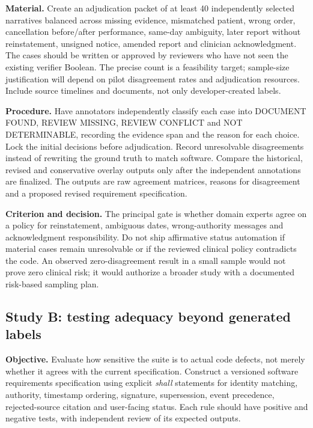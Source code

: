 \documentclass[11pt,twocolumn]{article}
\newcommand{\stage}[1]{\textsf{#1}}
\begin{document}
\textbf{Material.} Create an adjudication packet of at least 40 independently selected narratives balanced across missing evidence, mismatched patient, wrong order, cancellation before/after performance, same-day ambiguity, later report without reinstatement, unsigned notice, amended report and clinician acknowledgment. The cases should be written or approved by reviewers who have not seen the existing verifier Boolean. The precise count is a feasibility target; sample-size justification will depend on pilot disagreement rates and adjudication resources. Include source timelines and documents, not only developer-created labels.

\textbf{Procedure.} Have annotators independently classify each case into \stage{DOCUMENT FOUND}, \stage{REVIEW MISSING}, \stage{REVIEW CONFLICT} and \stage{NOT DETERMINABLE}, recording the evidence span and the reason for each choice. Lock the initial decisions before adjudication. Record unresolvable disagreements instead of rewriting the ground truth to match software. Compare the historical, revised and conservative overlay outputs only after the independent annotations are finalized. The outputs are raw agreement matrices, reasons for disagreement and a proposed revised requirement specification.

\textbf{Criterion and decision.} The principal gate is whether domain experts agree on a policy for reinstatement, ambiguous dates, wrong-authority messages and acknowledgment responsibility. Do not ship affirmative status automation if material cases remain unresolvable or if the reviewed clinical policy contradicts the code. An observed zero-disagreement result in a small sample would not prove zero clinical risk; it would authorize a broader study with a documented risk-based sampling plan.

\subsection{Study B: testing adequacy beyond generated labels}
\textbf{Objective.} Evaluate how sensitive the suite is to actual code defects, not merely whether it agrees with the current specification. Construct a versioned software requirements specification using explicit \emph{shall} statements for identity matching, authority, timestamp ordering, signature, supersession, event precedence, rejected-source citation and user-facing status. Each rule should have positive and negative tests, with independent review of its expected outputs.
\end{document}
